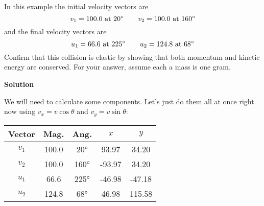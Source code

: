 \documentclass{article}
\begin{document}
\begin{center}
\def\vx{0}
\def\vy{0.684}
\label{fig:elas-col}
\end{center}


In this example the initial velocity vectors are
%
\begin{equation*}
v_1 = 100.0 \text{ at }  20^\circ \qquad
v_2 = 100.0 \text{ at } 160^\circ
\end{equation*}
and the final velocity vectors are
%
\begin{equation*}
u_1 =  66.6 \text{ at } 225^\circ \qquad
u_2 = 124.8 \text{ at }  68^\circ
\end{equation*}
Confirm that this collision is elastic by showing that both
momentum and kinetic energy are conserved. For your answer,
assume each a mass is one gram.
\par \textbf{Solution}
\par We will need to calculate some components. Let's just do them
all at once right now using $v_x = v \cos \theta$ and
$v_y = v \sin \theta$:


\begin{center}

\renewcommand{\arraystretch}{1.5}
\renewcommand{\tabcolsep}{0.2cm}

\begin{tabular}{ccccc}
\hline
\textbf{Vector} & \textbf{Mag.} & \textbf{Ang.} & \textbf{$x$} & \textbf{$y$} \\ 
\hline
 $v_1$ &  100.0 &  20° &  93.97 &  34.20 \\ 
 $v_2$ &  100.0 &  160° &  -93.97 &  34.20 \\ 
 $u_1$ &  66.6 &  225° &  -46.98 &  -47.18 \\ 
 $u_2$ &  124.8 &  68° &  46.98 &  115.58 \\ 
\hline
\end{tabular}



\end{center}
\end{document}
